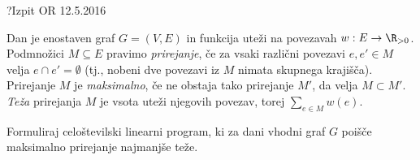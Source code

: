 \begin{naloga}{?}{Izpit OR 12.5.2016}
\begin{vprasanje}
Dan je enostaven graf $G = (V, E)$
in funkcija uteži na povezavah $w : E \to \R_{>0}$.
Podmnožici $M \subseteq E$ pravimo {\em prirejanje},
če za vsaki različni povezavi $e, e' \in M$ velja $e \cap e' = \emptyset$
(tj., nobeni dve povezavi iz $M$ nimata skupnega krajišča).
Prirejanje $M$ je {\em maksimalno},
če ne obstaja tako prirejanje $M'$, da velja $M \subset M'$.
{\em Teža} prirejanja $M$ je vsota uteži njegovih povezav,
torej $\sum_{e \in M} w(e)$.

Formuliraj celoštevilski linearni program,
ki za dani vhodni graf $G$ poišče maksimalno prirejanje najmanjše teže.
\end{vprasanje}
\begin{odgovor}
\end{odgovor}
\end{naloga}
